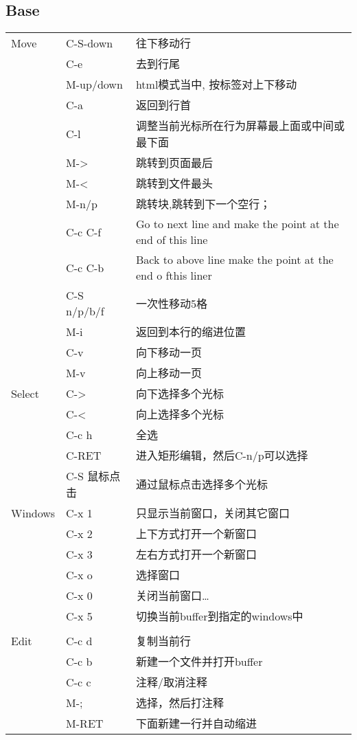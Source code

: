 \documentclass[10pt,a4paper]{article}
\begin{document}
\subsection{Base}
\label{sec-3-1}
\begin{center}
\begin{tabular}{lll}
\hline
Move & C-S-down & 往下移动行\\
 & C-e & 去到行尾\\
 & M-up/down & html模式当中, 按标签对上下移动\\
 & C-a & 返回到行首\\
 & C-l & 调整当前光标所在行为屏幕最上面或中间或最下面\\
 & M-> & 跳转到页面最后\\
 & M-< & 跳转到文件最头\\
 & M-n/p & 跳转块,跳转到下一个空行；\\
 & C-c C-f & Go to next line and make the point at the end of this line\\
 & C-c C-b & Back to above line make the point at the end o fthis liner\\
 & C-S n/p/b/f & 一次性移动5格\\
 & M-i & 返回到本行的缩进位置\\
 & C-v & 向下移动一页\\
 & M-v & 向上移动一页\\
\hline
Select & C-> & 向下选择多个光标\\
 & C-< & 向上选择多个光标\\
 & C-c h & 全选\\
 & C-RET & 进入矩形编辑，然后C-n/p可以选择\\
 & C-S 鼠标点击 & 通过鼠标点击选择多个光标\\
\hline
Windows & C-x 1 & 只显示当前窗口，关闭其它窗口\\
 & C-x 2 & 上下方式打开一个新窗口\\
 & C-x 3 & 左右方式打开一个新窗口\\
 & C-x o & 选择窗口\\
 & C-x 0 & 关闭当前窗口…\\
 & C-x 5 & 切换当前buffer到指定的windows中\\
 &  & \\
\hline
Edit & C-c d & 复制当前行\\
 & C-c b & 新建一个文件并打开buffer\\
 & C-c c & 注释/取消注释\\
 & M-; & 选择，然后打注释\\
 & M-RET & 下面新建一行并自动缩进\\

\end{tabular}
\end{center}
\end{document}
